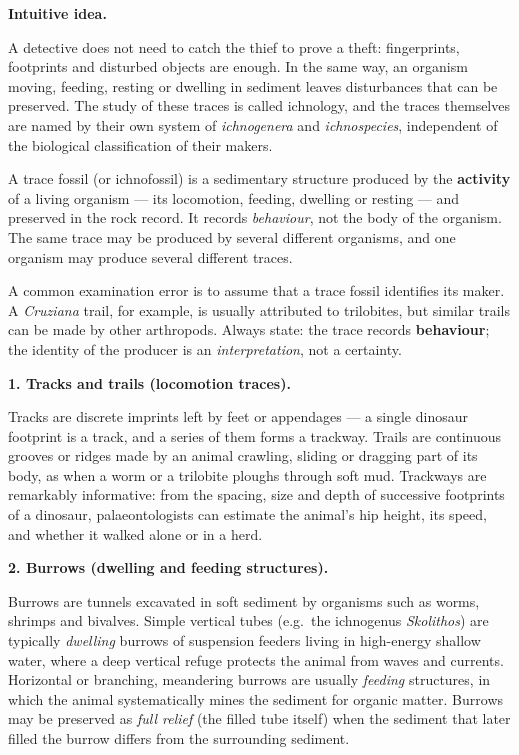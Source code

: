 \documentclass[11pt]{article}
\newcommand{\cle}[1]{{\popxbold\color{popdark}#1}}
\newcounter{popsec}
\newcounter{popsub}
\newcommand{\courssub}[1]{%
  \stepcounter{popsub}%
  \par\vspace{9pt}\noindent{\popxbold\fontsize{11.5}{13}\selectfont\color{popink}{\color{poporange}\thepopsec.\thepopsub}\hspace{6pt}#1}\par\nopagebreak\vspace{4pt}
}
\begin{document}
\textbf{Intuitive idea.}\par
A detective does not need to catch the thief to prove a theft: fingerprints, footprints and disturbed objects are enough. In the same way, an organism moving, feeding, resting or dwelling in sediment leaves disturbances that can be preserved. The study of these traces is called \cle{ichnology}, and the traces themselves are named by their own system of \emph{ichnogenera} and \emph{ichnospecies}, independent of the biological classification of their makers.

\begin{definition}
A \cle{trace fossil} (or \cle{ichnofossil}) is a sedimentary structure produced by the \textbf{activity} of a living organism --- its locomotion, feeding, dwelling or resting --- and preserved in the rock record. It records \emph{behaviour}, not the body of the organism. The same trace may be produced by several different organisms, and one organism may produce several different traces.
\end{definition}

\begin{attention}
A common examination error is to assume that a trace fossil identifies its maker. A \emph{Cruziana} trail, for example, is usually attributed to trilobites, but similar trails can be made by other arthropods. Always state: the trace records \textbf{behaviour}; the identity of the producer is an \emph{interpretation}, not a certainty.
\end{attention}

\courssub{The Main Types of Trace Fossils}

\textbf{1. Tracks and trails (locomotion traces).}\par
\cle{Tracks} are discrete imprints left by feet or appendages --- a single dinosaur footprint is a track, and a series of them forms a \cle{trackway}. \cle{Trails} are continuous grooves or ridges made by an animal crawling, sliding or dragging part of its body, as when a worm or a trilobite ploughs through soft mud. Trackways are remarkably informative: from the spacing, size and depth of successive footprints of a dinosaur, palaeontologists can estimate the animal's hip height, its speed, and whether it walked alone or in a herd.

\textbf{2. Burrows (dwelling and feeding structures).}\par
\cle{Burrows} are tunnels excavated in soft sediment by organisms such as worms, shrimps and bivalves. Simple vertical tubes (e.g.\ the ichnogenus \emph{Skolithos}) are typically \emph{dwelling} burrows of suspension feeders living in high-energy shallow water, where a deep vertical refuge protects the animal from waves and currents. Horizontal or branching, meandering burrows are usually \emph{feeding} structures, in which the animal systematically mines the sediment for organic matter. Burrows may be preserved as \emph{full relief} (the filled tube itself) when the sediment that later filled the burrow differs from the surrounding sediment.
\end{document}
